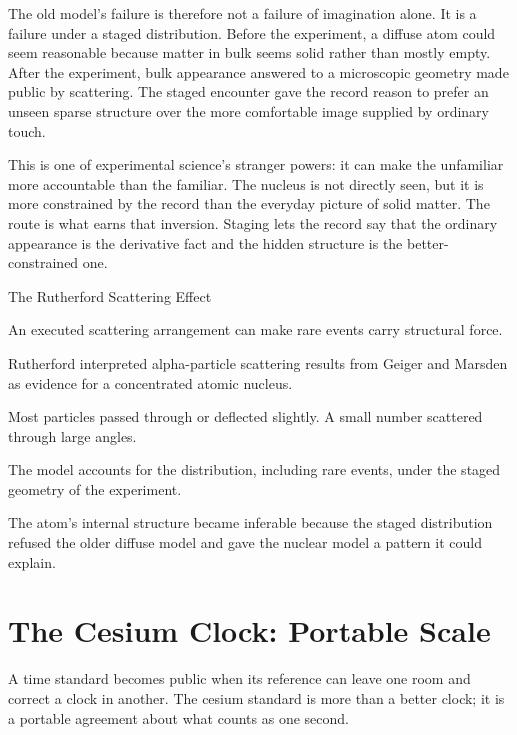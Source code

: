 The old model's failure is therefore not a failure of imagination alone.
It is a failure under a staged distribution. Before the experiment, a
diffuse atom could seem reasonable because matter in bulk seems solid
rather than mostly empty. After the experiment, bulk appearance answered
to a microscopic geometry made public by scattering. The staged encounter
gave the record reason to prefer an unseen sparse structure over the more
comfortable image supplied by ordinary touch.

This is one of experimental science's stranger powers: it can make the
unfamiliar more accountable than the familiar. The nucleus is not directly
seen, but it is more constrained by the record than the everyday picture
of solid matter. The route is what earns that inversion. Staging lets the
record say that the ordinary appearance is the derivative fact and the
hidden structure is the better-constrained one.

\begin{phenom}{The Rutherford Scattering Effect~\cite{rutherford1911}}
\label{ph:rutherford-scattering}

\PhStatement
An executed scattering arrangement can make rare events carry structural force.

\PhOrigin
Rutherford interpreted alpha-particle scattering results from Geiger and
Marsden as evidence for a concentrated atomic nucleus.

\PhObservation
Most particles passed through or deflected slightly. A small number scattered
through large angles.

\PhConstraint
The model accounts for the distribution, including rare events, under the
staged geometry of the experiment.

\PhConsequence
The atom's internal structure became inferable because the staged distribution
refused the older diffuse model and gave the nuclear model a pattern it could
explain.
\end{phenom}

\section{The Cesium Clock: Portable Scale}

A time standard becomes public when its reference can leave one room and
correct a clock in another. The cesium standard is more than a better clock;
it is a portable agreement about what counts as one second.

